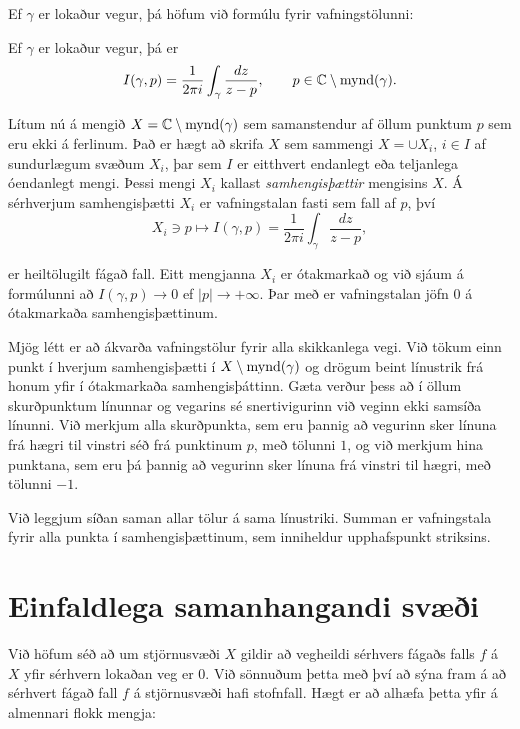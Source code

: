
\noindent
Ef $\gamma$ er lokaður vegur, þá höfum við formúlu fyrir
vafningstölunni:


\begin{se}  Ef $\gamma$ er lokaður vegur, þá er
 $$I(\gamma,p)=\dfrac 1{2\pi i}\int_\gamma \dfrac{dz}{z-p}, 
\qquad p\in {\mathbb C}\setminus {{\operatorname{mynd}(\gamma)}}.
 $$
\end{se}

 Lítum nú á mengið $X={\mathbb C}\setminus {{\operatorname{mynd}(\gamma)}}$ sem samanstendur af
öllum punktum $p$ sem eru ekki á ferlinum.    Það er hægt að skrifa
$X$ sem sammengi $X=\cup X_i$, $i\in I$ af sundurlægum svæðum $X_i$,
þar sem $I$ er eitthvert endanlegt eða teljanlega óendanlegt mengi.
Þessi mengi $X_i$ kallast {\it samhengisþættir}
mengisins $X$. Á sérhverjum samhengisþætti  $X_i$ er vafningstalan
fasti sem fall af $p$, því
$$
X_i\ni p\mapsto I(\gamma,p) = \dfrac 1{2\pi i}\int_\gamma \dfrac
{dz}{z-p}, 
$$

 
\noindent
er heiltölugilt fágað fall.  Eitt mengjanna $X_i$ er ótakmarkað og
við sjáum á formúlunni að $I(\gamma,p)\to 0$ ef $|p|\to +\infty$.
Þar með er vafningstalan jöfn $0$ á ótakmarkaða samhengisþættinum.


Mjög létt er að ákvarða vafningstölur fyrir alla skikkanlega
vegi.   Við tökum einn punkt í hverjum samhengisþætti í
$X\setminus{{\operatorname{mynd}(\gamma)}}$  og drögum beint línustrik frá honum yfir í
ótakmarkaða samhengisþáttinn.  Gæta verður þess að í öllum
skurðpunktum línunnar og vegarins sé snertivigurinn við veginn  ekki
samsíða línunni.    Við merkjum alla skurðpunkta, sem eru þannig að
vegurinn sker línuna frá hægri til vinstri séð frá punktinum $p$, 
með tölunni $1$, og við
merkjum hina punktana, sem eru þá þannig að vegurinn sker línuna frá
vinstri til hægri, með tölunni $-1$.  


\noindent
Við leggjum síðan saman allar tölur á sama línustriki.  Summan er
vafningstala fyrir alla punkta í samhengisþættinum, sem inniheldur 
upphafspunkt striksins. 


 
\section {Einfaldlega samanhangandi svæði}

\noindent
Við höfum séð að um stjörnusvæði $X$ gildir að
vegheildi sérhvers fágaðs falls $f$ á $X$ yfir sérhvern lokaðan veg
er $0$.  Við sönnuðum þetta með því að sýna fram á að sérhvert fágað
fall $f$ á stjörnusvæði hafi stofnfall.  Hægt er að alhæfa þetta yfir
á almennari flokk mengja:


